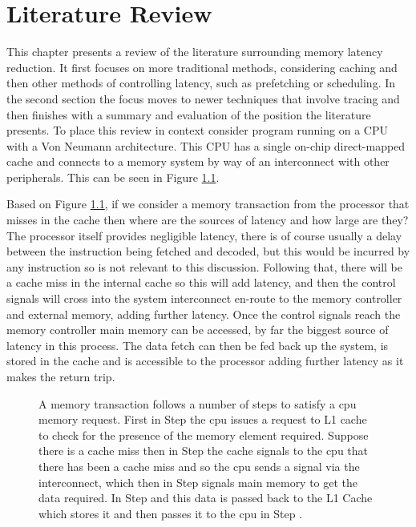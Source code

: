 \chapter{Literature Review}

This chapter presents a review of the literature surrounding memory latency reduction. It first focuses on more traditional methods, considering caching and then other methods of controlling latency, such as prefetching or scheduling. In the second section the focus moves to newer techniques that involve tracing and then finishes with a summary and evaluation of the position the literature presents. To place this review in context consider program running on a CPU with a Von Neumann architecture. This CPU has a single on-chip direct-mapped cache and connects to a memory system by way of an interconnect with other peripherals. This can be seen in Figure \ref{fig:journey-memory-transaction}.

Based on Figure \ref{fig:journey-memory-transaction}, if we consider a memory transaction from the processor that misses in the cache then where are the sources of latency and how large are they? The processor itself provides negligible latency, there is of course usually a delay between the instruction being fetched and decoded, but this would be incurred by any instruction so is not relevant to this discussion. Following that, there will be a cache miss in the internal cache so this will add latency, and then the control signals will cross into the system interconnect en-route to the memory controller and external memory, adding further latency. Once the control signals reach the memory controller main memory can be accessed, by far the biggest source of latency in this process. The data fetch can then be fed back up the system, is stored in the cache and is accessible to the processor adding further latency as it makes the return trip. 

\begin{figure}[ht]
	
	\caption[The Journey of a Memory Transaction]{A memory transaction follows a number of steps to satisfy a \gls{cpu} memory request. First in Step  the \gls{cpu} issues a request to L1 cache to check for the presence of the memory element required. Suppose there is a cache miss then in Step  the cache signals to the \gls{cpu} that there has been a cache miss and so the \gls{cpu} sends a signal via the interconnect, which then in Step  signals main memory to get the data required. In Step  and  this data is passed back to the L1 Cache which stores it and then passes it to the \gls{cpu} in Step .}
	\label{fig:journey-memory-transaction}
\end{figure}

